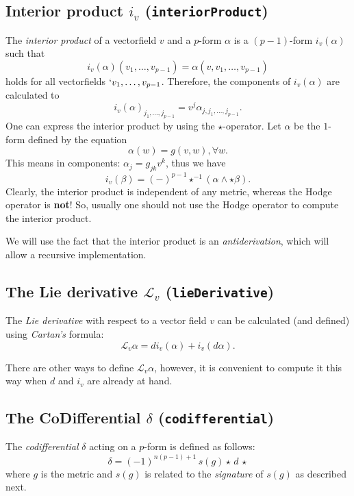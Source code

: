 \documentclass[12pt,a4paper]{article}
\begin{document}
\subsection{Interior product $i_v$ ({\tt interiorProduct})}
The {\it interior product} of a vectorfield $v$ and a $p$-form $\alpha$
is a $(p-1)$-form $i_v(\alpha)$ such that
\begin{displaymath}
	 i_v (\alpha) (v_1, \ldots, v_{p - 1}) = 
	   \alpha (v, v_1, \ldots, v_{p - 1})
\end{displaymath}
holds for all vectorfields $`v_1, \ldots, v_{p - 1}$. Therefore, the 
components of $i_v (\alpha)$ are calculated to
\begin{displaymath}
	 i_v (\alpha)_{j_1, \ldots, j_{p - 1}} = 
	 v^j \alpha_{j, j_1, \ldots, j_{p -1}}.
\end{displaymath}
One can express the interior product by using the $\star$-operator. 
Let $\alpha$ be the $1$-form defined by the equation 
\begin{displaymath}
	 \alpha (w) = g (v, w), \forall w. 
\end{displaymath}
This means in components: $\alpha_j = g_{j k} v^k$, 
thus we have
\begin{displaymath}
	i_v (\beta) = (-)^{p - 1} \star^{- 1} (\alpha \wedge \star \beta) .
\end{displaymath}
Clearly, the interior product is independent of any metric, whereas the 
Hodge operator is {\bf not}! So, usually one should not use the Hodge 
operator to compute the interior product.

We will use the fact that the interior product is an {\it antiderivation},
which will allow a recursive implementation.
%

\subsection{The Lie derivative $\mathcal{L}_v$ ({\tt lieDerivative})} 
The {\it Lie derivative} with respect to a vector field $v$ can be 
calculated (and defined) using {\it Cartan's} formula:
\begin{displaymath}\label{cartan}
	\mathcal{L}_v \alpha = d i_v (\alpha) + i_v (d \alpha).
\end{displaymath}

There are other ways to define $\mathcal{L}_v \alpha$, however, 
it is convenient to compute it this way when $d$ and $i_v$ are 
already at hand.
%

\subsection{The CoDifferential $\delta$ ({\tt codifferential})}
The {\it codifferential} $\delta$ acting on a $p$-form is defined 
as follows:
\begin{displaymath}
	 \delta = (-1)^{n(p-1)+1}\,s(g) \star\,d\,\star
\end{displaymath}
where $g$ is the metric and $s(g)$ is related to the 
{\it signature} of $s(g)$ as described next.
%
\end{document}
